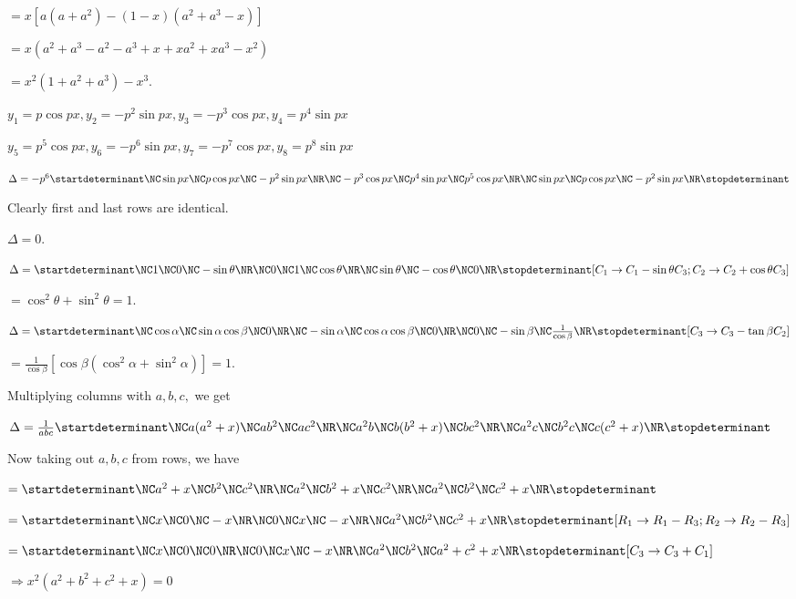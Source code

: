   $= x[a(a + a^2) - (1 - x)(a^2 + a^3 - x)]$

  $= x(a^2 + a^3 - a^2 - a^3 + x + xa^2 + xa^3 - x^2)$

  $= x^2(1 + a ^2 + a^3)- x^3$.
\item $y_1 = p\cos px, y_2 = -p^2\sin px, y_3 = -p^3\cos px, y_4 = p^4
  \sin px$

  $y_5 = p^5 \cos px, y_6 = -p^6\sin px, y_7 = -p^7\cos px, y_8 =
  p^8\sin px$

  $\Delta = -p^6 \startdeterminant\NC\sin px \NC p\cos px \NC -p^2 \sin px \NR\NC
  -p^3\cos px \NC p^4 \sin px \NC p^5 \cos px \NR\NC \sin px \NC p\cos px \NC -p^2 \sin
  px\NR\stopdeterminant$

  Clearly first and last rows are identical.

  $\Delta = 0$.
\item $\Delta = \startdeterminant\NC 1 \NC 0 \NC -\sin\theta \NR\NC 0 \NC 1 \NC \cos\theta
  \NR\NC \sin\theta \NC -\cos\theta \NC 0\NR\stopdeterminant[C_1 \rightarrow C_1
    - \sin\theta C_3; C_2 \rightarrow C_2 + \cos\theta C_3]$

  $= \cos^2\theta + \sin^2\theta = 1$.
\item $\Delta = \startdeterminant\NC\cos\alpha \NC \sin\alpha\cos\beta \NC 0 \NR\NC
  -\sin\alpha \NC \cos\alpha\cos\beta \NC 0 \NR\NC 0 \NC -\sin\beta \NC \frac{1}{\cos\beta}
  \NR\stopdeterminant[C_3 \rightarrow C_3 - \tan\beta C_2]$

  $= \frac{1}{\cos\beta}[\cos\beta(\cos^2\alpha + \sin^2\alpha)] = 1$.
\item Multiplying columns with $a, b, c,$ we get

  $\Delta = \frac{1}{abc}\startdeterminant\NC a(a^2 + x) \NC ab^2 \NC ac^2 \NR\NC
  a^2b \NC b(b^2 + x) \NC bc^2 \NR\NC a^2c \NC b^2c \NC c(c^2 + x)\NR\stopdeterminant$

  Now taking out $a, b, c$ from rows, we have

  $= \startdeterminant\NC a^2 + x \NC b^2 \NC c^2 \NR\NC a^2 \NC b^2 + x \NC c^2 \NR\NC a^2
  \NC b^2 \NC c^2 + x\NR\stopdeterminant$

  $= \startdeterminant\NC x \NC 0 \NC -x \NR\NC 0 \NC x \NC -x \NR\NC a^2 \NC b^2 \NC c^2 +
  x\NR\stopdeterminant[R_1\rightarrow R_1 - R_3; R_2\rightarrow R_2 - R_3]$

  $= \startdeterminant\NC x \NC 0 \NC 0 \NR\NC 0 \NC x \NC -x \NR\NC a^2 \NC b^2 \NC a^2 + c^2 +
  x\NR\stopdeterminant[C_3 \rightarrow C_3 + C_1]$

  $\Rightarrow x^2(a^2 + b^2 + c^2 + x) = 0$

